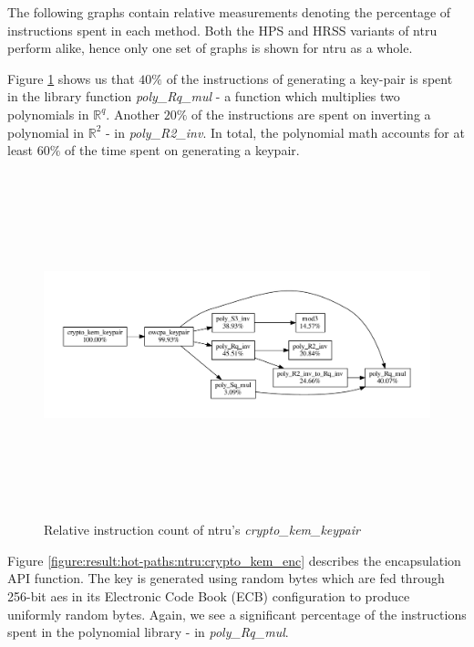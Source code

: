 The following graphs contain relative measurements denoting the percentage of instructions spent in each method. Both the HPS and HRSS variants of \gls{ntru} perform alike, hence only one set of graphs is shown for \gls{ntru} as a whole.

Figure \ref{figure:result:hot-paths:ntru:crypto_kem_keypair} shows us that $40\%$ of the instructions of generating a key-pair is spent in the library function \textit{poly\_Rq\_mul} - a function which multiplies two polynomials in $\mathbb{R}^q$. Another $20\%$ of the instructions are spent on inverting a polynomial in $\mathbb{R}^2$ - in \textit{poly\_R2\_inv}. In total, the polynomial math accounts for at least $60\%$ of the time spent on generating a keypair.

\begin{figure}[H]
    \centering
    \includegraphics[width=15cm, height=10cm, keepaspectratio]{chapters/results/hot-paths/ntru/crypto_kem_keypair.pdf}
    \caption{Relative instruction count of \gls{ntru}'s \textit{crypto\_kem\_keypair}}
    \label{figure:result:hot-paths:ntru:crypto_kem_keypair}
\end{figure}

Figure \ref{figure:result:hot-paths:ntru:crypto_kem_enc} describes the encapsulation API function. The key is generated using random bytes which are fed through 256-bit \gls{aes} in its Electronic Code Book (ECB) configuration to produce uniformly random bytes. Again, we see a significant percentage of the instructions spent in the polynomial library - in \textit{poly\_Rq\_mul}.

